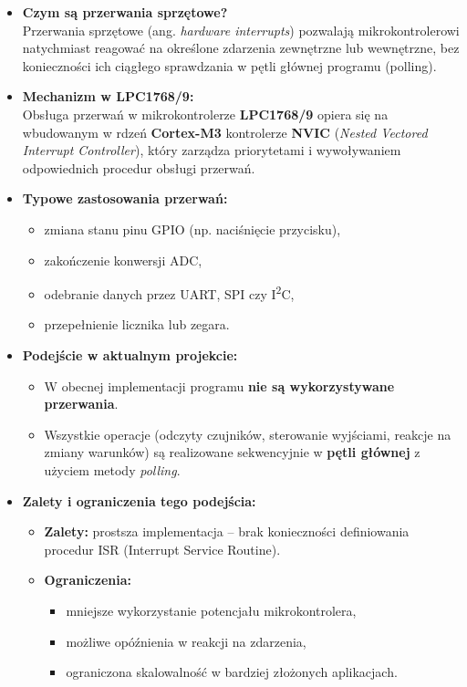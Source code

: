 \begin{itemize}
    \item \textbf{Czym są przerwania sprzętowe?} \\
    Przerwania sprzętowe (ang. \textit{hardware interrupts}) pozwalają mikrokontrolerowi natychmiast reagować na określone zdarzenia zewnętrzne lub wewnętrzne, bez konieczności ich ciągłego sprawdzania w pętli głównej programu (polling).
    
    \item \textbf{Mechanizm w LPC1768/9:} \\
    Obsługa przerwań w mikrokontrolerze \textbf{LPC1768/9} opiera się na wbudowanym w rdzeń \textbf{Cortex-M3} kontrolerze \textbf{NVIC} (\textit{Nested Vectored Interrupt Controller}), który zarządza priorytetami i wywoływaniem odpowiednich procedur obsługi przerwań.
    
    \item \textbf{Typowe zastosowania przerwań:}
    \begin{itemize}
        \item zmiana stanu pinu GPIO (np. naciśnięcie przycisku),
        \item zakończenie konwersji ADC,
        \item odebranie danych przez UART, SPI czy I\textsuperscript{2}C,
        \item przepełnienie licznika lub zegara.
    \end{itemize}

    \item \textbf{Podejście w aktualnym projekcie:}
    \begin{itemize}
        \item W obecnej implementacji programu \textbf{nie są wykorzystywane przerwania}.
        \item Wszystkie operacje (odczyty czujników, sterowanie wyjściami, reakcje na zmiany warunków) są realizowane sekwencyjnie w \textbf{pętli głównej} z użyciem metody \textit{polling}.
    \end{itemize}

    \item \textbf{Zalety i ograniczenia tego podejścia:}
    \begin{itemize}
        \item \textbf{Zalety:} prostsza implementacja – brak konieczności definiowania procedur ISR (Interrupt Service Routine).
        \item \textbf{Ograniczenia:}
        \begin{itemize}
            \item mniejsze wykorzystanie potencjału mikrokontrolera,
            \item możliwe opóźnienia w reakcji na zdarzenia,
            \item ograniczona skalowalność w bardziej złożonych aplikacjach.
        \end{itemize}
    \end{itemize}
\end{itemize}






